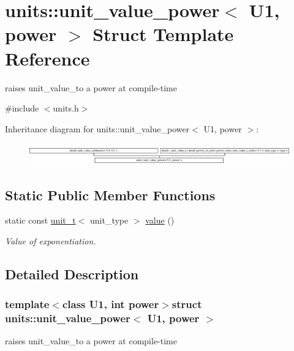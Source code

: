 \hypertarget{structunits_1_1unit__value__power}{}\section{units\+:\+:unit\+\_\+value\+\_\+power$<$ U1, power $>$ Struct Template Reference}
\label{structunits_1_1unit__value__power}


raises unit\+\_\+value\+\_\+to a power at compile-\/time  




{\ttfamily \#include $<$units.\+h$>$}

Inheritance diagram for units\+:\+:unit\+\_\+value\+\_\+power$<$ U1, power $>$\+:\begin{figure}[H]
\begin{center}
\leavevmode
\includegraphics[height=0.933333cm]{structunits_1_1unit__value__power}
\end{center}
\end{figure}
\subsection*{Static Public Member Functions}
\begin{DoxyCompactItemize}
\item 
static const \hyperlink{classunits_1_1unit__t}{unit\+\_\+t}$<$ unit\+\_\+type $>$ \hyperlink{structunits_1_1unit__value__power_a8eae2c1a34b99a111f78f57900859647}{value} ()
\begin{DoxyCompactList}\small\item\em Value of exponentiation. \end{DoxyCompactList}\end{DoxyCompactItemize}


\subsection{Detailed Description}
\subsubsection*{template$<$class U1, int power$>$struct units\+::unit\+\_\+value\+\_\+power$<$ U1, power $>$}

raises unit\+\_\+value\+\_\+to a power at compile-\/time 

